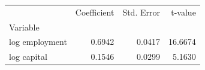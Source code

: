 \begin{tabular}{lrrr}
\toprule
 & Coefficient & Std. Error & t-value \\
Variable &  &  &  \\
\midrule
log employment & 0.6942 & 0.0417 & 16.6674 \\
log capital & 0.1546 & 0.0299 & 5.1630 \\
\bottomrule
\end{tabular}
